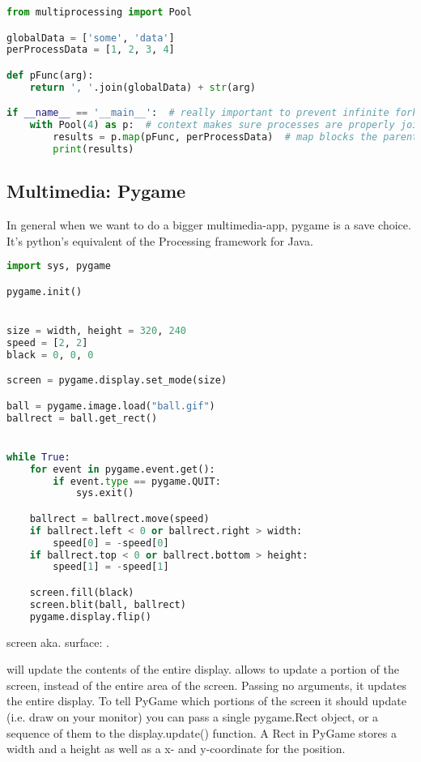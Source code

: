 \begin{lstlisting}[language=python]
from multiprocessing import Pool

globalData = ['some', 'data']
perProcessData = [1, 2, 3, 4]

def pFunc(arg):
    return ', '.join(globalData) + str(arg)

if __name__ == '__main__':  # really important to prevent infinite forking
    with Pool(4) as p:  # context makes sure processes are properly joined
        results = p.map(pFunc, perProcessData)  # map blocks the parent process until all children have been closed
        print(results)
\end{lstlisting}


\subsection{Multimedia: Pygame}

In general when we want to do  a bigger multimedia-app, pygame is a save choice. It's python's equivalent of the Processing framework for Java. 

\begin{lstlisting}[language=python]
import sys, pygame

pygame.init()


size = width, height = 320, 240
speed = [2, 2]
black = 0, 0, 0

screen = pygame.display.set_mode(size)

ball = pygame.image.load("ball.gif")
ballrect = ball.get_rect()


while True: 
    for event in pygame.event.get():
        if event.type == pygame.QUIT: 
            sys.exit()

    ballrect = ballrect.move(speed)
    if ballrect.left < 0 or ballrect.right > width:
        speed[0] = -speed[0]
    if ballrect.top < 0 or ballrect.bottom > height:
        speed[1] = -speed[1]

    screen.fill(black)
    screen.blit(ball, ballrect)
    pygame.display.flip()

\end{lstlisting}


screen aka. surface: .

 will update the contents of the entire display.  allows to update a portion of the screen, instead of the entire area of the screen. Passing no arguments, it updates the entire display. 
To tell PyGame which portions of the screen it should update (i.e. draw on your monitor) you can pass a single pygame.Rect object, or a sequence of them to the display.update() function. A Rect in PyGame stores a width and a height as well as a x- and y-coordinate for the position.

